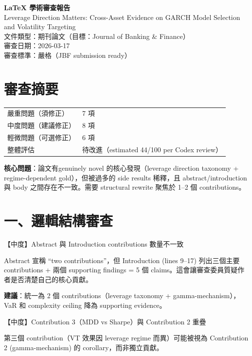 \documentclass[12pt,a4paper]{article}
\begin{document}
\begin{center}
{\Large\bfseries LaTeX 學術審查報告}\\[0.5em]
{\large Leverage Direction Matters: Cross-Asset Evidence on GARCH Model Selection and Volatility Targeting}\\[0.5em]
{\normalsize 文件類型：期刊論文（目標：Journal of Banking \& Finance）}\\
{\normalsize 審查日期：2026-03-17}\\
{\normalsize 審查標準：嚴格（JBF submission ready）}
\end{center}

\section*{審查摘要}

\begin{tabular}{ll}
\textcolor{errorred}{嚴重問題（須修正）} & 7 項 \\
\textcolor{warncolor}{中度問題（建議修正）} & 8 項 \\
輕微問題（可選修正） & 6 項 \\
整體評估 & 待改進（estimated 44/100 per Codex review） \\
\end{tabular}

\bigskip
\noindent\textbf{核心問題}：論文有genuinely novel 的核心發現（leverage direction taxonomy + regime-dependent gold），但被過多的 side results 稀釋，且 abstract/introduction 與 body 之間存在不一致。需要 structural rewrite 聚焦於 1--2 個 contributions。

\section*{一、邏輯結構審查}

\textcolor{warncolor}{【中度】Abstract 與 Introduction contributions 數量不一致}

Abstract 宣稱 ``two contributions''，但 Introduction (lines 9--17) 列出三個主要 contributions + 兩個 supporting findings = 5 個 claims。這會讓審查委員質疑作者是否清楚自己的核心貢獻。

\textbf{建議}：統一為 2 個 contributions（leverage taxonomy + gamma-mechanism），VaR 和 complexity ceiling 降為 supporting evidence。

\bigskip
\textcolor{warncolor}{【中度】Contribution 3（MDD vs Sharpe）與 Contribution 2 重疊}

第三個 contribution（VT 效果因 leverage regime 而異）可能被視為 Contribution 2 (gamma-mechanism) 的 corollary，而非獨立貢獻。
\end{document}

